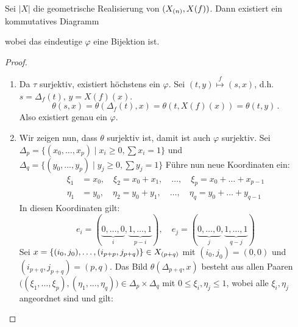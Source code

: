 \begin{lemma}
  Sei $|X|$ die geometrische Realisierung von $(X_{(n)}, X(f))$. Dann
  existiert ein kommutatives Diagramm
  \begin{center}
  \end{center}
  wobei das eindeutige $\varphi$ eine Bijektion ist.
\end{lemma}
\begin{proof}
  \begin{enumerate}[label=(\alph*)]
    \item Da $\tau$ surjektiv, existiert höchstens ein $\varphi$. Sei 
      $(t,y) \overset f \longmapsto (s,x)$, d.h. $s = \Delta_f(t)$, 
      $y = X(f)(x)$.
      \[ \theta(s,x) = \theta(\Delta_f(t),x) = \theta(t, X(f)(x))
        = \theta(t,y)\,.\]
      Also existiert genau ein $\varphi$.
    \item Wir zeigen nun, dass $\theta$ surjektiv ist, damit ist auch $\varphi$
      surjektiv.
      Sei $\Delta_p = \{ (x_0,\ldots, x_p) \mid x_i\geq 0, \sum x_i = 1\}$
      und $\Delta_q = \{ (y_0,\ldots,y_p) \mid y_j\geq 0, \sum y_j = 1\}$
      Führe nun neue Koordinaten ein:
      \begin{align*}
        \xi_1 &= x_0,\quad \xi_2 = x_0+x_1,\quad\ldots,\quad 
          \xi_p = x_0 + \ldots + x_{p-1}\\
        \eta_1 &= y_0, \quad \eta_2 = y_0+y_1, \quad\ldots,\quad 
          \eta_q = y_0 + \ldots + y_{q-1}
      \end{align*}
      In diesen Koordinaten gilt:
      \[ e_i = (\underbrace{0,\ldots,0}_i, \underbrace{1,\ldots,1}_{p-i}),\quad
      e_j = (\underbrace{0,\ldots,0}_j, \underbrace{1,\ldots,1}_{q-j}) \]
      Sei $x = \{(i_0,j_0) ,\ldots, (i_{p+p},j_{p+q})\} \in X_{(p+q)}$ mit
      $(i_0,j_0) = (0,0)$ und $(i_{p+q},j_{p+q}) = (p,q)$.
      Das Bild $\theta(\Delta_{p+q}, x)$ besteht aus allen Paaren
      $\big( (\xi_1,\ldots,\xi_p),(\eta_1,\ldots,\eta_q) \big) \in 
      \Delta_p\times\Delta_q$ mit $0\leq \xi_i,\eta_j\leq 1$, wobei alle
      $\xi_i,\eta_j$ angeordnet sind und gilt:
      \begin{enumerate}[label=(\roman*)]

\end{enumerate}
\end{enumerate}
\end{proof}
